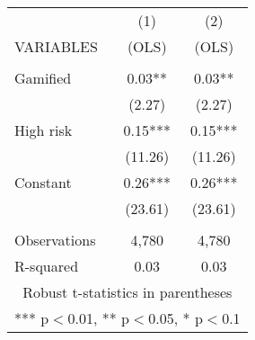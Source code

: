 \documentclass[]{article}
\begin{document}
\begin{tabular}{lcc} \hline
 & (1) & (2) \\
VARIABLES & (OLS) & (OLS) \\ \hline
 &  &  \\
Gamified & 0.03** & 0.03** \\
 & (2.27) & (2.27) \\
High risk & 0.15*** & 0.15*** \\
 & (11.26) & (11.26) \\
Constant & 0.26*** & 0.26*** \\
 & (23.61) & (23.61) \\
 &  &  \\
Observations & 4,780 & 4,780 \\
 R-squared & 0.03 & 0.03 \\ \hline
\multicolumn{3}{c}{ Robust t-statistics in parentheses} \\
\multicolumn{3}{c}{ *** p$<$0.01, ** p$<$0.05, * p$<$0.1} \\
\end{tabular}
\end{document}
